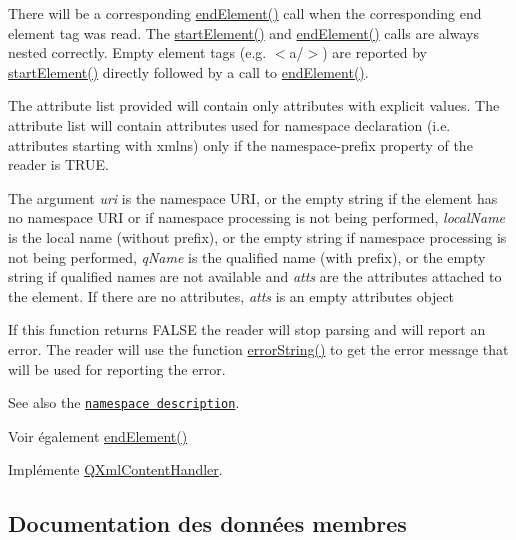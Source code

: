 There will be a corresponding \hyperlink{class_base_handler_aa1b987506d2f962ba478b8bab388bff9}{end\+Element()} call when the corresponding end element tag was read. The \hyperlink{class_base_handler_a15c20baf7065b3eb92ae7a336ccdf20b}{start\+Element()} and \hyperlink{class_base_handler_aa1b987506d2f962ba478b8bab388bff9}{end\+Element()} calls are always nested correctly. Empty element tags (e.\+g. $<$a/$>$) are reported by \hyperlink{class_base_handler_a15c20baf7065b3eb92ae7a336ccdf20b}{start\+Element()} directly followed by a call to \hyperlink{class_base_handler_aa1b987506d2f962ba478b8bab388bff9}{end\+Element()}.

The attribute list provided will contain only attributes with explicit values. The attribute list will contain attributes used for namespace declaration (i.\+e. attributes starting with xmlns) only if the namespace-\/prefix property of the reader is T\+R\+U\+E.

The argument {\itshape uri} is the namespace U\+R\+I, or the empty string if the element has no namespace U\+R\+I or if namespace processing is not being performed, {\itshape local\+Name} is the local name (without prefix), or the empty string if namespace processing is not being performed, {\itshape q\+Name} is the qualified name (with prefix), or the empty string if qualified names are not available and {\itshape atts} are the attributes attached to the element. If there are no attributes, {\itshape atts} is an empty attributes object

If this function returns F\+A\+L\+S\+E the reader will stop parsing and will report an error. The reader will use the function \hyperlink{class_q_xml_default_handler_afcbe5fdce86cea4b7863e752c2413c45}{error\+String()} to get the error message that will be used for reporting the error.

See also the \href{xml-sax.html#namespaces}{\tt namespace description}.

\begin{DoxySeeAlso}{Voir également}
\hyperlink{class_base_handler_aa1b987506d2f962ba478b8bab388bff9}{end\+Element()} 
\end{DoxySeeAlso}


Implémente \hyperlink{class_q_xml_content_handler_af6d4e631fad2b9b75622c95003b1da55}{Q\+Xml\+Content\+Handler}.



\subsection{Documentation des données membres}
\hypertarget{class_base_handler_a465e89308ad37f5fe49c2d64365584eb}{}
